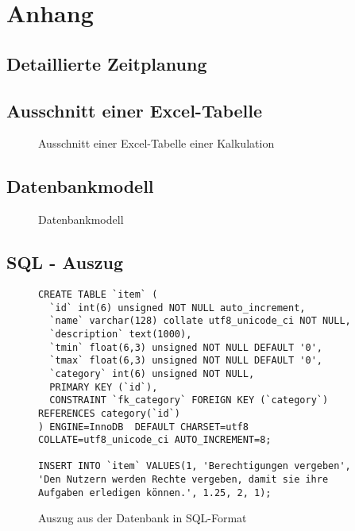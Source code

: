\section{Anhang}
\subsection{Detaillierte Zeitplanung}
\label{app:Zeitplanung}


\clearpage



\subsection{Ausschnitt einer Excel-Tabelle}
\label{app:Exceltabelle}
\begin{figure}[htb]
\centering
{}
\caption{Ausschnitt einer Excel-Tabelle einer Kalkulation}
\end{figure}
\clearpage

\subsection{Datenbankmodell}
\label{app:Datenbankmodell}
\begin{figure}[htb]
\centering
{}
\caption{Datenbankmodell}
\end{figure}
\clearpage

\subsection{SQL - Auszug}
\label{app:SQL}
\begin{figure}[htb]
\begin{lstlisting}
CREATE TABLE `item` (
  `id` int(6) unsigned NOT NULL auto_increment,
  `name` varchar(128) collate utf8_unicode_ci NOT NULL,
  `description` text(1000),
  `tmin` float(6,3) unsigned NOT NULL DEFAULT '0',
  `tmax` float(6,3) unsigned NOT NULL DEFAULT '0',
  `category` int(6) unsigned NOT NULL,
  PRIMARY KEY (`id`),
  CONSTRAINT `fk_category` FOREIGN KEY (`category`) REFERENCES category(`id`)
) ENGINE=InnoDB  DEFAULT CHARSET=utf8 COLLATE=utf8_unicode_ci AUTO_INCREMENT=8;

INSERT INTO `item` VALUES(1, 'Berechtigungen vergeben', 'Den Nutzern werden Rechte vergeben, damit sie ihre Aufgaben erledigen können.', 1.25, 2, 1);
\end{lstlisting}
\caption{Auszug aus der Datenbank in SQL-Format}
\end{figure}
\clearpage


\clearpage

\clearpage
